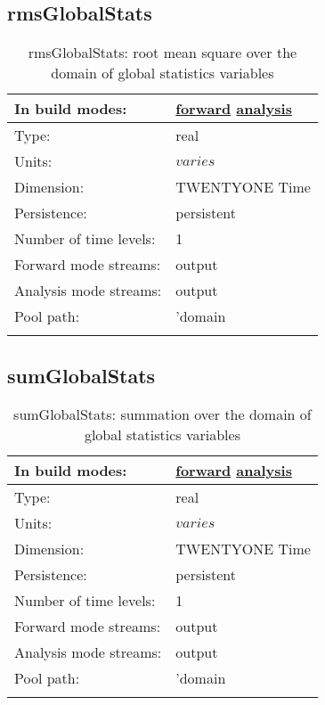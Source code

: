 \subsection[rmsGlobalStats]{rmsGlobalStats}
\label{subsec:var_sec_amGlobalStats_rmsGlobalStats}
\begin{center}
\begin{longtable}{| p{2.0in} | p{4.0in} |}
        \hline 
        In build modes: & \hyperref[subsec:forward_var_tab_amGlobalStats]{forward} \hyperref[subsec:analysis_var_tab_amGlobalStats]{analysis} \\
        \hline 
        Type: & real \\
        \hline 
        Units: & $varies$ \\
        \hline 
        Dimension: & TWENTYONE Time \\
        \hline 
        Persistence: & persistent \\
        \hline 
        Number of time levels: & 1 \\
        \hline 
		 Forward mode streams: &  output \\
        \hline 
		 Analysis mode streams: &  output \\
        \hline 
            Pool path: & 'domain %
 \\
		 \hline 
    \caption{rmsGlobalStats: root mean square over the domain of global statistics variables}
\end{longtable}
\end{center}
\subsection[sumGlobalStats]{sumGlobalStats}
\label{subsec:var_sec_amGlobalStats_sumGlobalStats}
\begin{center}
\begin{longtable}{| p{2.0in} | p{4.0in} |}
        \hline 
        In build modes: & \hyperref[subsec:forward_var_tab_amGlobalStats]{forward} \hyperref[subsec:analysis_var_tab_amGlobalStats]{analysis} \\
        \hline 
        Type: & real \\
        \hline 
        Units: & $varies$ \\
        \hline 
        Dimension: & TWENTYONE Time \\
        \hline 
        Persistence: & persistent \\
        \hline 
        Number of time levels: & 1 \\
        \hline 
		 Forward mode streams: &  output \\
        \hline 
		 Analysis mode streams: &  output \\
        \hline 
            Pool path: & 'domain %
 \\
		 \hline 
    \caption{sumGlobalStats: summation over the domain of global statistics variables}
\end{longtable}
\end{center}
